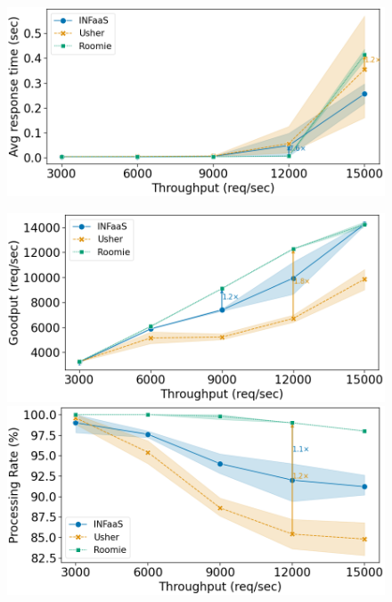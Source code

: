 \begin{figure}
	\begin{minipage}[t]{.24\textwidth}
		\centering
		\includegraphics[width=\linewidth]{chapters/roomie/images/NvidiaA100/synthetic-all-models/response_time_line.png}
		\label{fig:NvidiaA100/synthetic-all-models/response-time}
	\end{minipage}
	\hfill
	\begin{minipage}[t]{.24\textwidth}
		\centering
		\includegraphics[width=\textwidth]{chapters/roomie/images/NvidiaA100/synthetic-all-models/goodput_line.png}
	\end{minipage}
	\hfill
	\begin{minipage}[t]{.24\textwidth}
		\centering
		\includegraphics[width=\linewidth]{chapters/roomie/images/NvidiaA100/synthetic-all-models/normalized_line.png}

\end{minipage}
\end{figure}

